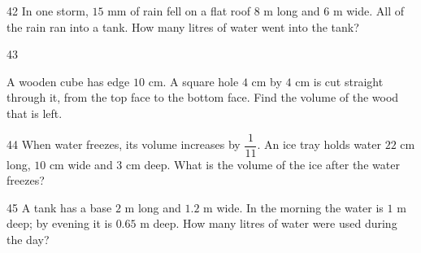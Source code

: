 \gap
\begin{probbox}{42}{}
In one storm, $15$ mm of rain fell on a flat roof $8$ m long and $6$ m wide. All of the rain ran into a tank. How many litres of water went into the tank?
\end{probbox}
\gap
\begin{probbox}{43}{}
\begin{minipage}[t]{0.6\linewidth}
A wooden cube has edge $10$ cm. A square hole $4$ cm by $4$ cm is cut straight through it, from the top face to the bottom face. Find the volume of the wood that is left.
\end{minipage}\hfill
\begin{minipage}[t]{0.36\linewidth}\vspace{0pt}\centering
{}
\end{minipage}
\end{probbox}
\gap
\begin{probbox}{44}{}
When water freezes, its volume increases by $\dfrac1{11}$. An ice tray holds water $22$ cm long, $10$ cm wide and $3$ cm deep. What is the volume of the ice after the water freezes?
\end{probbox}
\gap
\begin{probbox}{45}{}
A tank has a base $2$ m long and $1.2$ m wide. In the morning the water is $1$ m deep; by evening it is $0.65$ m deep. How many litres of water were used during the day?
\end{probbox}

